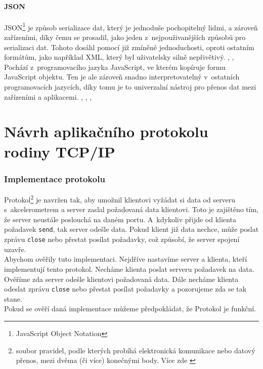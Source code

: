 \documentclass[12pt]{report}			%
\begin{document}
				\subsection{JSON}
				
				
JSON\footnote{JavaScript Object Notation} je způsob serializace dat, který je jednoduše pochopitelný lidmi, a zároveň zařízeními, díky čemu se prosadil, jako jeden z~nejpouživanějších způsobů pro serializaci dat. Tohoto dosáhl pomocí již zmíněné jednoduchosti, oproti ostatním formátům, jako například XML, který byl uživatelsky silně nepřivětivý. \cite{JSON1}, \cite{JSON2}, \cite{JSON3}
\\
Pochází z~programovacího jazyka JavaScript, ve kterém kopíruje formu JavaScript objektu. Ten je ale zároveň snadno interpretovatelný v~ostatních programovacích jazycích, díky tomu je to univerzalní nástroj pro přenos dat mezi zařízeními a aplikacemi. \cite{JSON1}, \cite{JSON2}, \cite{JSON3}, \cite{JSON4}


			

	\part{Návrh aplikačního protokolu rodiny TCP/IP}



\section{Implementace protokolu}
Protokol\footnote{soubor pravidel, podle kterých probíhá elektronická komunikace nebo datový přenos, mezi dvěma (či více) konečnými body. Více zde \cite{slovnik}} 
je navržen tak, aby umožnil klientovi vyžádat si data od serveru s~akcelerometrem a server zaslal požadovaná data klientovi. Toto je zajištěno tím, že server neustále poslouchá na daném portu. A~kdykoliv přijde od klienta požadavek \texttt{send}, tak server odešle data. Pokud klient již data nechce, může poslat zprávu \texttt{close} nebo přestat posílat požadavky, což způsobí, že server spojení uzavře.
\\
Abychom ověřily tuto implementaci. Nejdříve nastavíme server a klienta, kteří implementují tento protokol. Necháme klienta poslat serveru požadavek na data. Ověříme zda server odešle klientovi požadovaná data. Dále necháme klienta odeslat zprávu \texttt{close} nebo přestat posílat požadavky a pozorujeme zda se tak stane.
\\
Pokud se ověří daná implementace můžeme předpokládat, že Protokol je funkční.
\\
\end{document}
